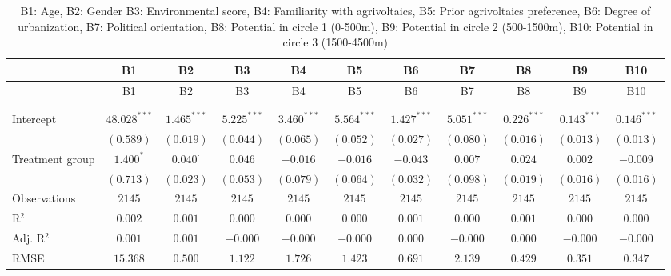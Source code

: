 
\begin{center}
\begin{small}
\begin{longtable}{l@{} c@{} c@{} c@{} c@{} c@{} c@{} c@{} c@{} c@{} c@{}}
\hline
 & B1 & B2 & B3 & B4 & B5 & B6 & B7 & B8 & B9 & B10 \\
\hline
\endfirsthead
\hline
 & B1 & B2 & B3 & B4 & B5 & B6 & B7 & B8 & B9 & B10 \\
\hline
\endhead
\hline
\endfoot
\hline
\multicolumn{11}{l}{\tiny{$^{***}p<0.001$; $^{**}p<0.01$; $^{*}p<0.05$; $^{\cdot}p<0.1$}}\\
\caption{B1: Age, B2: Gender B3: Environmental score,
               B4: Familiarity with agrivoltaics, B5: Prior agrivoltaics preference, 
               B6: Degree of urbanization, B7: Political orientation, B8: Potential in circle 1 (0-500m),
               B9: Potential in circle 2 (500-1500m), B10: Potential in circle 3 (1500-4500m)}
\label{table:coefficients}
\endlastfoot \\
Intercept       & $48.028^{***}$ & $1.465^{***}$   & $5.225^{***}$ & $3.460^{***}$ & $5.564^{***}$ & $1.427^{***}$ & $5.051^{***}$ & $0.226^{***}$ & $0.143^{***}$ & $0.146^{***}$ \\
                & $(0.589)$      & $(0.019)$       & $(0.044)$     & $(0.065)$     & $(0.052)$     & $(0.027)$     & $(0.080)$     & $(0.016)$     & $(0.013)$     & $(0.013)$     \\
Treatment group & $1.400^{*}$    & $0.040^{\cdot}$ & $0.046$       & $-0.016$      & $-0.016$      & $-0.043$      & $0.007$       & $0.024$       & $0.002$       & $-0.009$      \\
                & $(0.713)$      & $(0.023)$       & $(0.053)$     & $(0.079)$     & $(0.064)$     & $(0.032)$     & $(0.098)$     & $(0.019)$     & $(0.016)$     & $(0.016)$     \\
\hline
Observations    & $2145$         & $2145$          & $2145$        & $2145$        & $2145$        & $2145$        & $2145$        & $2145$        & $2145$        & $2145$        \\
R$^2$           & $0.002$        & $0.001$         & $0.000$       & $0.000$       & $0.000$       & $0.001$       & $0.000$       & $0.001$       & $0.000$       & $0.000$       \\
Adj. R$^2$      & $0.001$        & $0.001$         & $-0.000$      & $-0.000$      & $-0.000$      & $0.000$       & $-0.000$      & $0.000$       & $-0.000$      & $-0.000$      \\
RMSE            & $15.368$       & $0.500$         & $1.122$       & $1.726$       & $1.423$       & $0.691$       & $2.139$       & $0.429$       & $0.351$       & $0.347$       \\
\end{longtable}
\end{small}
\end{center}
